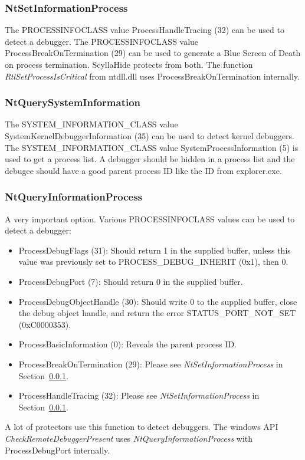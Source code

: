 \documentclass[10pt,a4paper]{article}
\begin{document}
\subsubsection{NtSetInformationProcess}
\label{sec:NtSetInformationProcess_section}
The PROCESSINFOCLASS value ProcessHandleTracing (32) can be used to detect a debugger. The PROCESSINFOCLASS value ProcessBreakOnTermination (29) can be used to generate a Blue Screen of Death on process termination. ScyllaHide protects from both. The function \textit{RtlSetProcessIsCritical} from ntdll.dll uses ProcessBreakOnTermination internally.

\subsubsection{NtQuerySystemInformation}
The SYSTEM\_INFORMATION\_CLASS value SystemKernelDebuggerInformation (35) can be used to detect kernel debuggers. The SYSTEM\_INFORMATION\_CLASS value SystemProcessInformation (5) is used to get a process list. A debugger should be hidden in a process list and the debugee should have a good parent process ID like the ID from explorer.exe.

\subsubsection{NtQueryInformationProcess}
A very important option. Various PROCESSINFOCLASS values can be used to detect a debugger:
\begin{itemize}
\item ProcessDebugFlags (31): Should return 1 in the supplied buffer, unless this value was previously set to PROCESS\_DEBUG\_INHERIT (0x1), then 0.
\item ProcessDebugPort (7): Should return 0 in the supplied buffer.
\item ProcessDebugObjectHandle (30): Should write 0 to the supplied buffer, close the debug object handle, and return the error STATUS\_PORT\_NOT\_SET (0xC0000353).
\item ProcessBasicInformation (0): Reveals the parent process ID.
\item ProcessBreakOnTermination (29): Please see \textit{NtSetInformationProcess} in Section~\ref{sec:NtSetInformationProcess_section}.
\item ProcessHandleTracing (32): Please see \textit{NtSetInformationProcess} in Section~\ref{sec:NtSetInformationProcess_section}.
\end{itemize}
A lot of protectors use this function to detect debuggers. The windows API \textit{CheckRemoteDebuggerPresent} uses \textit{NtQueryInformationProcess} with ProcessDebugPort internally.
\end{document}

